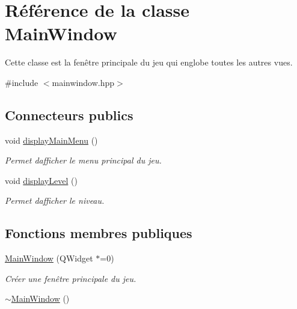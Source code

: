\hypertarget{classMainWindow}{}\section{Référence de la classe Main\+Window}
\label{classMainWindow}


Cette classe est la fenêtre principale du jeu qui englobe toutes les autres vues.  




{\ttfamily \#include $<$mainwindow.\+hpp$>$}

\subsection*{Connecteurs publics}
\begin{DoxyCompactItemize}
\item 
void \hyperlink{classMainWindow_a378316f6c8670867a82a7806cfa050d8}{display\+Main\+Menu} ()
\begin{DoxyCompactList}\small\item\em Permet d\textquotesingle{}afficher le menu principal du jeu. \end{DoxyCompactList}\item 
void \hyperlink{classMainWindow_a0aadedf51803aeb60945aa0f809ddaa0}{display\+Level} ()
\begin{DoxyCompactList}\small\item\em Permet d\textquotesingle{}afficher le niveau. \end{DoxyCompactList}\end{DoxyCompactItemize}
\subsection*{Fonctions membres publiques}
\begin{DoxyCompactItemize}
\item 
\hyperlink{classMainWindow_a2022dfcfcd6eeba03aec9f1e6eb3ece0}{Main\+Window} (Q\+Widget $\ast$=0)
\begin{DoxyCompactList}\small\item\em Créer une fenêtre principale du jeu. \end{DoxyCompactList}\item 
\hyperlink{classMainWindow_ae98d00a93bc118200eeef9f9bba1dba7}{$\sim$\+Main\+Window} ()
\end{DoxyCompactItemize}
